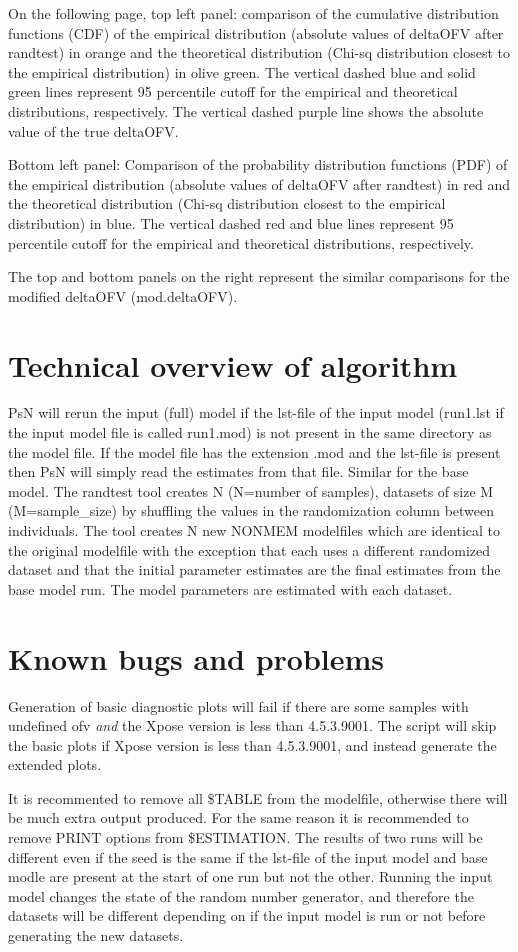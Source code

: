 On the following page, top left panel: comparison of the cumulative distribution functions (CDF) of the empirical distribution (absolute values of deltaOFV after randtest) in orange and the theoretical distribution (Chi-sq distribution closest to the empirical distribution) in olive green. The vertical dashed blue and solid green lines represent 95 percentile cutoff for the empirical and theoretical distributions, respectively. The vertical dashed purple line shows the absolute value of the true deltaOFV.

Bottom left panel: Comparison of the probability distribution functions (PDF) of the empirical distribution (absolute values of deltaOFV after randtest) in red and the theoretical distribution (Chi-sq distribution closest to the empirical  distribution) in blue. The vertical dashed red and blue lines represent 95 percentile cutoff for the empirical and theoretical distributions, respectively.

The top and bottom panels on the right represent the similar comparisons for the modified deltaOFV (mod.deltaOFV).

\section{Technical overview of algorithm}

PsN will rerun the input (full) model if the lst-file of the input model (run1.lst if the input model file is called run1.mod) is not present in the same directory as the model file. 
If the model file has the extension .mod and the lst-file is present then PsN will simply read the estimates from that file. Similar for the base model.
The randtest tool creates N (N=number of samples), datasets of size M (M=sample\_size) by shuffling the values in the randomization column between individuals. The tool creates N new NONMEM modelfiles which are identical to the original modelfile with the exception that each uses a different randomized dataset and that the initial parameter estimates are the final estimates from the base model run. The model parameters are estimated with each dataset.


\section{Known bugs and problems}
Generation of basic diagnostic plots will fail if there are some samples
with undefined ofv \emph{and} the Xpose version is less than 4.5.3.9001.
The script will skip the basic plots if Xpose version is less than 4.5.3.9001, and instead generate the extended plots.

It is recommented to remove all \$TABLE from the modelfile, otherwise there will be much extra output produced. For the same reason it is recommended to remove PRINT options from \$ESTIMATION. 
The results of two runs will be different even if the seed is the same if the lst-file of the input model and base modle are present at the start of one run but not the other. Running the input model changes the state of the random number generator, and therefore the datasets will be different depending on if the input model is run or not before generating the  new datasets.




